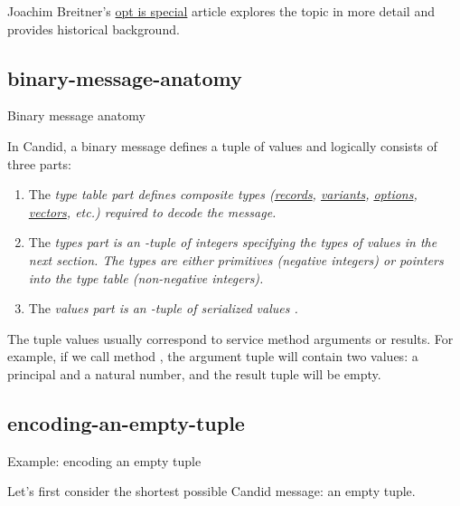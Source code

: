\documentclass{article}
\begin{document}
Joachim Breitner's \href{https://www.joachim-breitner.de/blog/784-A_Candid_explainer__Opt_is_special}{opt is special} article explores the topic in more detail and provides historical background.

\subsection{binary-message-anatomy}{Binary message anatomy}

In Candid, a binary message defines a tuple of  values and logically consists of three parts:
\begin{enumerate}
    \item
    The \em{type table} part defines composite types (\href{https://internetcomputer.org/docs/current/references/candid-ref#type-record--n--t--}{records}, \href{https://internetcomputer.org/docs/current/references/candid-ref#type-variant--n--t--}{variants}, \href{https://internetcomputer.org/docs/current/references/candid-ref#type-opt-t}{options}, \href{https://internetcomputer.org/docs/current/references/candid-ref#type-vec-t}{vectors}, etc.) required to decode the message.
    \item
    The \em{types} part is an -tuple of integers specifying the types  of values in the next section.
    The types are either primitives (negative integers) or pointers into the type table (non-negative integers).
    \item
    The \em{values} part is an -tuple of serialized values .
\end{enumerate}

The tuple values usually correspond to service method arguments or results.
For example, if we call method , the argument tuple will contain two values: a principal and a natural number, and the result tuple will be empty.

\subsection{encoding-an-empty-tuple}{Example: encoding an empty tuple}

Let's first consider the shortest possible Candid message: an empty tuple.

\begin{figure}
\end{figure}
\end{document}
